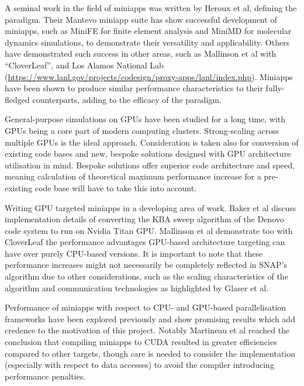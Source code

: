 \documentclass[conference]{IEEEtran}
\begin{document}
A seminal work in the field of miniapps was written by Heroux et al\cite{miniapps}, defining the paradigm. Their Mantevo miniapp suite has show successful development of miniapps, such as MiniFE for finite element analysis and MiniMD for molecular dynamics simulations, to demonstrate their versatility and applicability. Others have demonstrated such success in other areas, such as Mallinson et al with ``CloverLeaf”\cite{mallinson2013cloverleaf}, and Los Alamos National Lab (\url{https://www.lanl.gov/projects/codesign/proxy-apps/lanl/index.php}). Miniapps have been shown to produce similar performance characteristics to their fully-fledged counterparts\cite{miniapps}, adding to the efficacy of the paradigm.

General-purpose simulations on GPUs have been studied for a long time, with GPUs being a core part of modern computing clusters\cite{debardeleben2013gpu}. Strong-scaling across multiple GPUs\cite{glaser2015strong} is the ideal approach. Consideration is taken also for conversion of existing code bases\cite{zhou2011gpu} and new, bespoke solutions designed with GPU architecture utilisation in mind\cite{glaser2015strong}. Bespoke solutions offer superior code architecture and speed, meaning calculation of theoretical maximum performance increase for a pre-existing code base will have to take this into account.

Writing GPU targeted miniapps in a developing area of work. Baker et al\cite{baker2012high} discuss implementation details of converting the KBA sweep algorithm of the Denovo code system to run on Nvidia Titan GPU. Mallinson et al\cite{mallinson2013cloverleaf} demonstrate too with CloverLeaf the performance advantages GPU-based architecture targeting can have over purely CPU-based versions. It is important to note that these performance increases might not necessarily be completely reflected in SNAP’s algorithm due to other considerations, such as the scaling characteristics of the algorithm\cite{shoukourian2014predicting} and communication technologies as highlighted by Glaser et al\cite{glaser2015strong}.

Performance of miniapps with respect to CPU- and GPU-based parallelisation frameworks have been explored previously and show promising results which add credence to the motivation of this project. Notably Martineau et al\cite{martineau2017productivity} reached the conclusion that compiling miniapps to CUDA resulted in greater efficiencies compared to other targets, though care is needed to consider the implementation (especially with respect to data accesses) to avoid the compiler introducing performance penalties.
\end{document}
